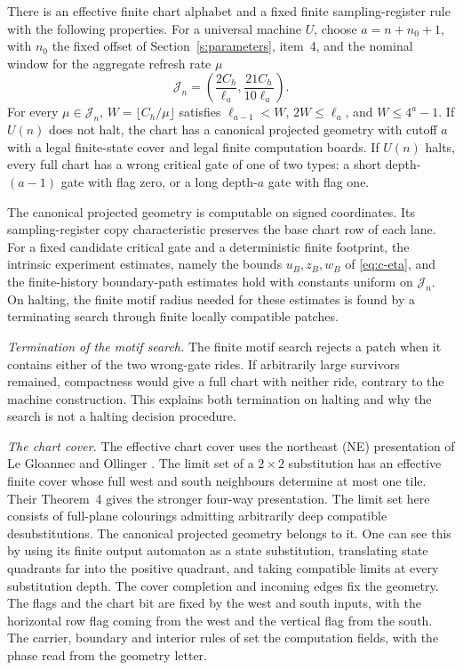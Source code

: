 \begin{proposition}\label{c:selector-import}
There is an effective finite chart alphabet and a fixed finite sampling-register rule
with the following properties. For a universal machine \(U\), choose
\(a=n+n_0+1\), with \(n_0\) the fixed offset of
Section~\ref{s:parameters}, item~4, and the nominal window for the
aggregate refresh rate \(\mu\)
\begin{equation}\label{eq:c-window}
 \mathcal J_n=\left(\frac{2C_h}{\ell_a},\frac{21C_h}{10\ell_a}\right).
\end{equation}
For every \(\mu\in\mathcal J_n\), \(W=\lfloor C_h/\mu\rfloor\)
satisfies \(\ell_{a-1}<W\), \(2W\le\ell_a\), and \(W\le4^a-1\). If \(U(n)\) does not halt, the chart has a canonical
projected geometry with cutoff \(a\) with a legal finite-state cover and legal
finite computation boards. If \(U(n)\) halts, every full chart has a wrong
critical gate of one of two types: a short depth-\((a-1)\) gate with flag
zero, or a long depth-\(a\) gate with flag one.

The canonical projected geometry is computable on signed coordinates.
Its sampling-register copy characteristic preserves the base chart row of each lane.
For a fixed candidate critical gate and a deterministic finite footprint,
the intrinsic experiment estimates, namely the bounds \(u_B,z_B,w_B\) of
\eqref{eq:c-eta}, and the finite-history boundary-path estimates
\cite[Lemma~11.6]{DMNoise2026} hold with constants uniform on \(\mathcal J_n\). On halting, the finite
motif radius needed for these estimates is found by a terminating search
through finite locally compatible patches.
\end{proposition}

\emph{Termination of the motif search.} The finite motif search rejects a patch when it contains either of
the two wrong-gate rides. If arbitrarily large survivors remained,
compactness would give a full chart with neither ride, contrary to the
machine construction. This explains both termination on halting and why
the search is not a halting decision procedure.

\emph{The chart cover.} The effective chart cover
uses the northeast (NE) presentation of Le Gloannec and Ollinger
\cite[Theorem~3]{LGO2012}. The limit set of a \(2\times2\) substitution has
an effective finite cover whose full west and south neighbours determine
at most one tile. Their Theorem~4 gives the stronger four-way presentation. The limit set here consists of full-plane colourings
admitting arbitrarily deep compatible desubstitutions. The canonical
projected geometry belongs to it. One can see this by using its finite
output automaton as a state substitution, translating state quadrants
far into the positive quadrant, and taking compatible limits at every
substitution depth. The cover completion and incoming edges fix the
geometry. The flags and the chart bit are fixed by the west and south
inputs, with the horizontal row flag coming from the west and the
vertical flag from the south. The carrier, boundary and interior rules
of \cite[Lemma~11.3 and its preceding update table]{DMNoise2026} set the
computation fields, with the phase read from the geometry letter.

